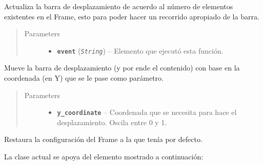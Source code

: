 \documentclass[class=report, crop=false]{standalone}
\begin{document}
\begin{fulllineitems}
\begin{fulllineitems}
Actualiza la barra de desplazamiento de acuerdo al número de 
elementos existentes en el Frame, esto para poder hacer un 
recorrido apropiado de la barra.

\begin{quote}\begin{description}
\item[{Parameters}] \leavevmode\begin{itemize}
\item \textbf{\texttt{event}} (\emph{\texttt{String}}) -- Elemento que ejecutó esta función.
\end{itemize}
\end{description}\end{quote}

\end{fulllineitems}

\begin{fulllineitems}

Mueve la barra de desplazamiento (y por ende el contenido)
con base en la coordenada (en Y) que se le pase como parámetro.

\begin{quote}\begin{description}
\item[{Parameters}] \leavevmode\begin{itemize}
\item \textbf{\texttt{y\_coordinate}} -- Coordenada que se necesita para hace el desplazamiento. Oscila entre 0 y 1.
\end{itemize}
\end{description}\end{quote}

\end{fulllineitems}

\begin{fulllineitems}

Restaura la configuración del Frame a la que tenía por
defecto.

\end{fulllineitems}

\end{fulllineitems}

La clase actual se apoya del elemento mostrado a continuación:
\end{document}
